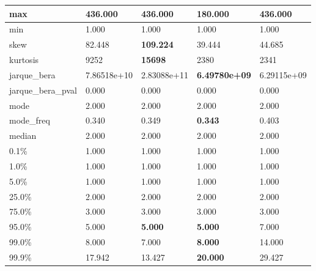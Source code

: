 \begin{table}[H]
\begin{tabular}{|l|m{10em}|m{10em}|m{10em}|m{10em}|}
\hline max & 436.000 & \bfseries 436.000 & \cellcolor[rgb]{0.9, 0.54, 0.52} 180.000 & \bfseries 436.000 \\
\hline min & 1.000 & 1.000 & 1.000 & 1.000 \\
\hline skew & 82.448 & \bfseries 109.224 & \cellcolor[rgb]{0.9, 0.54, 0.52} 39.444 & 44.685 \\
\hline kurtosis & 9252 & \bfseries 15698 & 2380 & \cellcolor[rgb]{0.9, 0.54, 0.52} 2341 \\
\hline jarque\_bera & 7.86518e+10 & \cellcolor[rgb]{0.9, 0.54, 0.52} 2.83088e+11 & \bfseries 6.49780e+09 & 6.29115e+09 \\
\hline jarque\_bera\_pval & 0.000 & 0.000 & 0.000 & 0.000 \\
\hline mode & 2.000 & 2.000 & 2.000 & 2.000 \\
\hline mode\_freq & 0.340 & 0.349 & \bfseries 0.343 & \cellcolor[rgb]{0.9, 0.54, 0.52} 0.403 \\
\hline median & 2.000 & 2.000 & 2.000 & 2.000 \\
\hline 0.1\% & 1.000 & 1.000 & 1.000 & 1.000 \\
\hline 1.0\% & 1.000 & 1.000 & 1.000 & 1.000 \\
\hline 5.0\% & 1.000 & 1.000 & 1.000 & 1.000 \\
\hline 25.0\% & 2.000 & 2.000 & 2.000 & 2.000 \\
\hline 75.0\% & 3.000 & 3.000 & 3.000 & 3.000 \\
\hline 95.0\% & 5.000 & \bfseries 5.000 & \bfseries 5.000 & \cellcolor[rgb]{0.9, 0.54, 0.52} 7.000 \\
\hline 99.0\% & 8.000 & 7.000 & \bfseries 8.000 & \cellcolor[rgb]{0.9, 0.54, 0.52} 14.000 \\
\hline 99.9\% & 17.942 & 13.427 & \bfseries 20.000 & \cellcolor[rgb]{0.9, 0.54, 0.52} 29.427 \\
\hline
\end{tabular}
\end{table}
